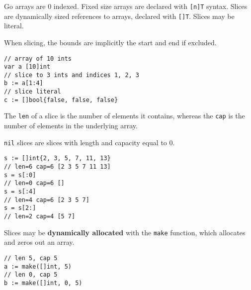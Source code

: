 \documentclass{article}
\begin{document}
\begin{paracol}{2}

Go arrays are 0 indexed. Fixed size arrays are declared with \lstinline{[n]T} syntax. Slices are dynamically sized references to arrays, declared with \lstinline{[]T}.
Slices may be literal.

When slicing, the bounds are implicitly the start and end if excluded.
\switchcolumn    

\begin{lstlisting}
// array of 10 ints
var a [10]int
// slice to 3 ints and indices 1, 2, 3
b := a[1:4]
// slice literal
c := []bool{false, false, false}
\end{lstlisting}


\switchcolumn*
\noindent The \lstinline{len} of a slice is the number of elements it contains, whereas the \lstinline{cap} is the number of elements in the underlying array.

\lstinline{nil} slices are slices with length and capacity equal to 0.

\switchcolumn    

\begin{lstlisting}
s := []int{2, 3, 5, 7, 11, 13}
// len=6 cap=6 [2 3 5 7 11 13]
s = s[:0]
// len=0 cap=6 []
s = s[:4]
// len=4 cap=6 [2 3 5 7]
s = s[2:]
// len=2 cap=4 [5 7]
\end{lstlisting}


\switchcolumn*
\noindent Slices may be \textbf{dynamically allocated} with the \lstinline|make| function, which allocates and zeros out an array.\\

\switchcolumn

\begin{lstlisting}
// len 5, cap 5
a := make([]int, 5)
// len 0, cap 5
b := make([]int, 0, 5)
\end{lstlisting}


\end{paracol}
\end{document}
